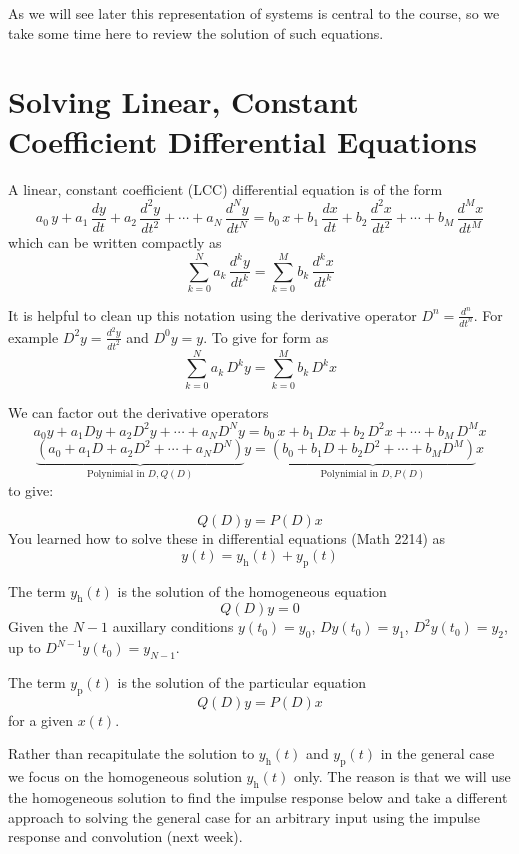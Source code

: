 As we will see later this representation of systems is central to the course, so we take some time here to review the solution of such equations.
 
\section{Solving Linear, Constant Coefficient Differential Equations}

A linear, constant coefficient (LCC) differential equation is of the form
\[
a_0\, y + a_1\, \frac{dy}{dt} + a_2\, \frac{d^2y}{dt^2} + \cdots + a_N\, \frac{d^Ny}{dt^N}  = b_0\, x + b_1\, \frac{dx}{dt} + b_2\, \frac{d^2x}{dt^2} + \cdots + b_M\, \frac{d^Mx}{dt^M}
\]
which can be written compactly as
\[
\sum\limits_{k = 0}^{N} a_k\, \frac{d^ky}{dt^k} = \sum\limits_{k = 0}^{M} b_k\, \frac{d^kx}{dt^k}
\]

It is helpful to clean up this notation using the derivative operator $D^n = \frac{d^n}{dt^n}$. For example
$D^2y = \frac{d^2y}{dt^2}$ and $D^0 y= y$. To give for form as
\[
\sum\limits_{k = 0}^{N} a_k\, D^k y = \sum\limits_{k = 0}^{M} b_k\, D^k x
\]

We can factor out the derivative operators
\[
a_0y + a_1Dy + a_2D^2y + \cdots + a_ND^Ny  = b_0\, x + b_1\, Dx + b_2\, D^2x + \cdots + b_M\, D^M x
\]
\[
\underbrace{\left(a_0 + a_1D + a_2D^2 + \cdots + a_ND^N\right)}_{\text{Polynimial in } D, Q(D)} y = \underbrace{\left(b_0 + b_1 D + b_2 D^2 + \cdots + b_M D^M\right)}_{\text{Polynimial in } D, P(D)} x
\]
to give:
  
\[
Q(D)y = P(D)x
\]
You learned how to solve these in differential equations (Math 2214) as
\[
y(t) = y_\text{h}(t) + y_\text{p}(t)
\]

The term $y_\text{h}(t)$ is the solution of the homogeneous equation
\[
Q(D)y = 0
\]
Given the $N-1$ auxillary conditions $y(t_0) = y_0$, $Dy(t_0) = y_1$, $D^2y(t_0) = y_2$, up to $D^{N-1}y(t_0) = y_{N-1}$.

The term $y_\text{p}(t)$ is the solution of the particular equation
\[
Q(D)y = P(D)x
\]
for a given $x(t)$.

Rather than recapitulate the solution to $y_\text{h}(t)$ and $y_\text{p}(t)$ in the general case we focus on the homogeneous solution $y_\text{h}(t)$ only. The reason is that we will use the homogeneous solution to find the impulse response below and take a different approach to solving the general case for an arbitrary input using the impulse response and convolution (next week).

